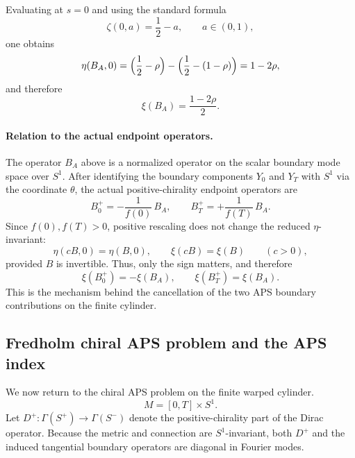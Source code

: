 \documentclass[11pt]{article}
\theoremstyle{definition}
\numberwithin{equation}{section}
\begin{document}
Evaluating at $s=0$ and using the standard formula
\begin{equation}
\zeta(0,a)=\frac12-a,
\qquad a\in(0,1),
\end{equation}
one obtains
\begin{equation}
\label{eq:eta-circle-rewrite}
\eta(B_A,0)
=
\Bigl(\frac12-\rho\Bigr)-\Bigl(\frac12-(1-\rho)\Bigr)
=
1-2\rho,
\end{equation}
and therefore
\begin{equation}
\label{eq:xi-circle-rewrite}
\xi(B_A)=\frac{1-2\rho}{2}.
\end{equation}












\paragraph{Relation to the actual endpoint operators.}
The operator \(B_A\) above is a normalized operator on the scalar boundary mode space over \(S^1\). After identifying the boundary components \(Y_0\) and \(Y_T\) with \(S^1\) via the coordinate \(\theta\), the actual positive-chirality endpoint operators are
\begin{equation}
B_0^+=-\frac1{f(0)}\,B_A,
\qquad
B_T^+=+\frac1{f(T)}\,B_A.
\end{equation}
Since \(f(0),f(T)>0\), positive rescaling does not change the reduced \(\eta\)-invariant:
\begin{equation}
\eta(cB,0)=\eta(B,0),\qquad \xi(cB)=\xi(B)\qquad (c>0),
\end{equation}
provided \(B\) is invertible. Thus, only the sign matters, and therefore
\begin{equation}
\xi(B_0^+)=-\xi(B_A),\qquad \xi(B_T^+)=\xi(B_A).
\end{equation}
This is the mechanism behind the cancellation of the two APS boundary contributions on the finite cylinder.
\subsection{Fredholm chiral APS problem and the APS index}
\label{subsec:fredholm-aps}

We now return to the chiral APS problem on the finite warped cylinder.
\begin{equation}
M=[0,T]\times S^1.
\end{equation}
Let $D^+:\Gamma(S^+)\to\Gamma(S^-)$ denote the positive-chirality part of the Dirac operator.
Because the metric and connection are $S^1$-invariant, both $D^+$ and the induced tangential boundary operators are diagonal in Fourier modes.
\end{document}
